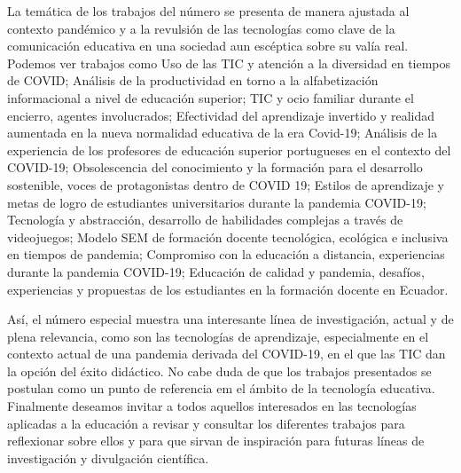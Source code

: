 \documentclass[spanish]{textolivre}
\begin{document}
La temática de los trabajos del número se presenta de manera ajustada al contexto pandémico y a la revulsión de las tecnologías como clave de la comunicación educativa en una sociedad aun escéptica sobre su valía real. Podemos ver trabajos como Uso de las TIC y atención a la diversidad en tiempos de COVID; Análisis de la productividad en torno a la alfabetización informacional a nivel de educación superior; TIC y ocio familiar durante el encierro, agentes involucrados; Efectividad del aprendizaje invertido y realidad aumentada en la nueva normalidad educativa de la era Covid-19; Análisis de la experiencia de los profesores de educación superior portugueses en el contexto del COVID-19; Obsolescencia del conocimiento y la formación para el desarrollo sostenible, voces de protagonistas dentro de COVID 19; Estilos de aprendizaje y metas de logro de estudiantes universitarios durante la pandemia COVID-19; Tecnología y abstracción, desarrollo de habilidades complejas a través de videojuegos; Modelo SEM de formación docente tecnológica, ecológica e inclusiva en tiempos de pandemia; Compromiso con la educación a distancia, experiencias durante la pandemia COVID-19; Educación de calidad y pandemia, desafíos, experiencias y propuestas de los estudiantes en la formación docente en Ecuador. 

Así, el número especial muestra una interesante línea de investigación, actual y de plena relevancia, como son las tecnologías de aprendizaje, especialmente en el contexto actual de una pandemia derivada del COVID-19, en el que las TIC dan la opción del éxito didáctico. No cabe duda de que los trabajos presentados se postulan como un punto de referencia em el ámbito de la tecnología educativa. Finalmente deseamos invitar a todos aquellos interesados en las tecnologías aplicadas a la educación a revisar y consultar los diferentes trabajos para reflexionar sobre ellos y para que sirvan de inspiración para futuras líneas de investigación y divulgación científica.

\printbibliography\label{sec-bib}
\end{document}

